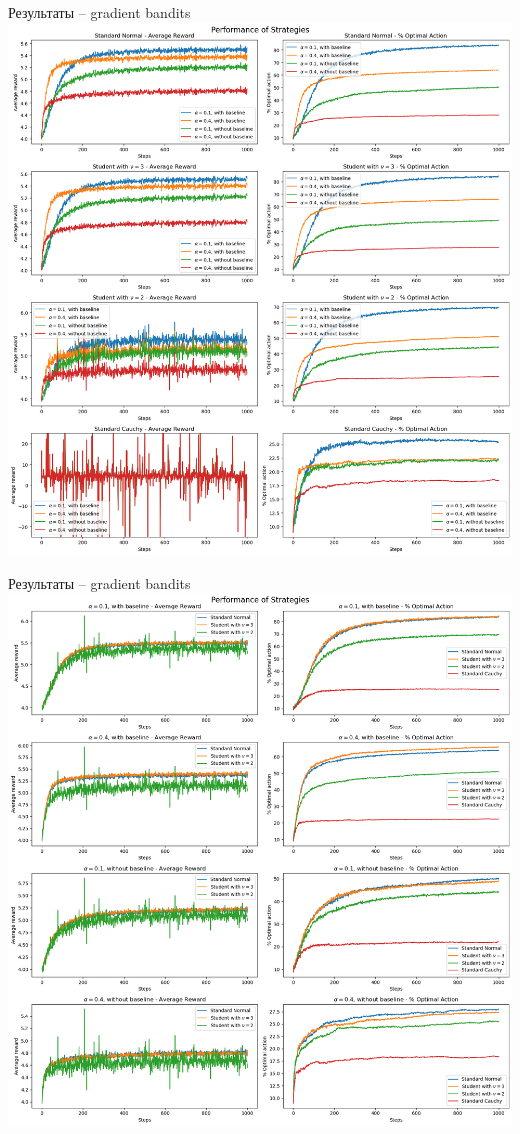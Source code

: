 \documentclass[11pt]{beamer} %
\begin{document}
    \begin{frame}{Результаты -- gradient bandits}
        \includegraphics[scale=0.13,center]{images/bandit_tester/gradient_1.png}
    \end{frame}
    \begin{frame}{Результаты -- gradient bandits}
        \includegraphics[scale=0.13,center]{images/bandit_tester/gradient_2.png}
    \end{frame}
\end{document}
